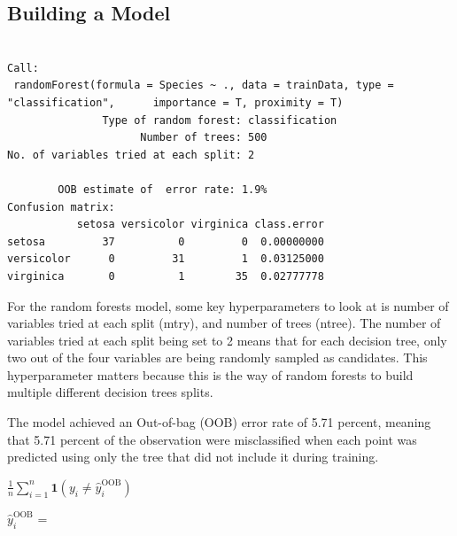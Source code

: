 \documentclass[
  11pt,
  letterpaper,
]{article}
\begin{document}
\subsection{Building a Model}\label{building-a-model}

\begin{verbatim}

Call:
 randomForest(formula = Species ~ ., data = trainData, type = "classification",      importance = T, proximity = T) 
               Type of random forest: classification
                     Number of trees: 500
No. of variables tried at each split: 2

        OOB estimate of  error rate: 1.9%
Confusion matrix:
           setosa versicolor virginica class.error
setosa         37          0         0  0.00000000
versicolor      0         31         1  0.03125000
virginica       0          1        35  0.02777778
\end{verbatim}

For the random forests model, some key hyperparameters to look at is
number of variables tried at each split (mtry), and number of trees
(ntree). The number of variables tried at each split being set to 2
means that for each decision tree, only two out of the four variables
are being randomly sampled as candidates. This hyperparameter matters
because this is the way of random forests to build multiple different
decision trees splits.

The model achieved an Out-of-bag (OOB) error rate of 5.71 percent,
meaning that 5.71 percent of the observation were misclassified when
each point was predicted using only the tree that did not include it
during training.

\(\frac{1}{n} \sum_{i=1}^{n} \mathbf{1}\left( y_i \neq \hat{y}_i^{\text{OOB}} \right)\)

\(\hat{y}_i^{\text{OOB}}\) =
\end{document}
